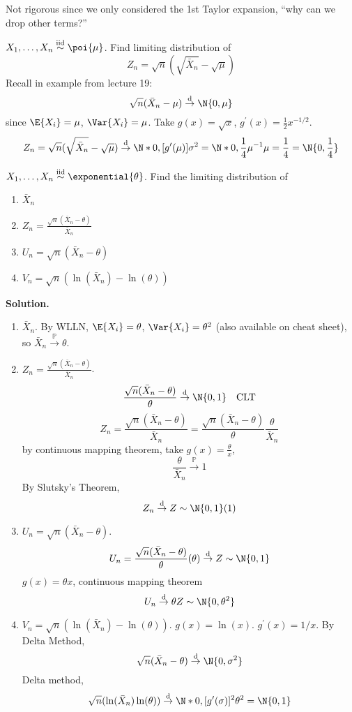 Not rigorous since we only considered the 1st Taylor expansion,
``why can we drop other terms?''
\begin{Example}{}{}
    $ X_1,\ldots,X_n \stackrel{\text{iid}}{\sim}\poi{\mu} $.
    Find limiting distribution of
    \[ Z_n=\sqrt{n}(\sqrt{\bar{X}_n}-\sqrt{\mu}) \]
    Recall in example from lecture 19:
    \[ \sqrt{n}(\bar{X}_n-\mu)\stackrel{\text{d}}{\to}
        \N{0,\mu} \]
    since $ \E{X_i}=\mu $, $ \Var{X_i}=\mu $.
    Take $ g(x)=\sqrt{x} $, $ g^\prime(x)=\frac{1}{2} x^{-1/2} $.
    \[ Z_n=\sqrt{n}(\sqrt{\bar{X}_n}-\sqrt{\mu})\stackrel{\text{d}}{\to}
        \N*{0,[g^\prime(\mu)]\sigma^2}=
        \N*{0,\frac{1}{4}\mu^{-1}\mu=\frac{1}{4}}=\N{0,\frac{1}{4}} \]
\end{Example}
\begin{Example}{}{}
    $ X_1,\ldots,X_n \stackrel{\text{iid}}{\sim}\exponential{\theta} $.
    Find the limiting distribution of
    \begin{enumerate}
        \item $ \bar{X}_n $
        \item $ \displaystyle Z_n=\frac{\sqrt{n}(\bar{X}_n-\theta)}{\bar{X}_n} $
        \item $ U_n=\sqrt{n}(\bar{X}_n-\theta) $
        \item $ V_n=\sqrt{n}(\ln(\bar{X}_n)-\ln(\theta)) $
    \end{enumerate}
    \textbf{Solution.}
    \begin{enumerate}
        \item $ \bar{X}_n $.
              By WLLN, $ \E{X_i}=\theta $, $ \Var{X_i}=\theta^2 $
              (also available on cheat sheet), so $ \bar{X}_n
                  \stackrel{\mathbb{P}}{\to}\theta $.
        \item $ \displaystyle Z_n=\frac{\sqrt{n}(\bar{X}_n-\theta)}{\bar{X}_n} $.
              \[ \frac{\sqrt{n}(\bar{X}_n-\theta)}{\theta} \stackrel{\text{d}}{\to}
                  \N{0,1}\quad \text{CLT} \]
              \[ Z_n=\frac{\sqrt{n}(\bar{X}_n-\theta)}{\bar{X}_n}=
                  \frac{\sqrt{n}(\bar{X}_n-\theta)}{\theta}\frac{\theta}{\bar{X}_n} \]
              by continuous mapping theorem, take $ g(x)=\frac{\theta}{x} $,
              \[ \frac{\theta}{\bar{X}_n}\stackrel{\mathbb{P}}{\to}1 \]
              By Slutsky's Theorem,
              \[ Z_n\stackrel{\text{d}}{\to}Z \sim \N{0,1}(1) \]
        \item $ U_n=\sqrt{n}(\bar{X}_n-\theta) $.
              \[ U_n=\frac{\sqrt{n}(\bar{X}_n-\theta)}{\theta}(\theta)
                  \stackrel{\text{d}}{\to}Z \sim \N{0,1}
              \]
              $ g(x)=\theta x $, continuous mapping theorem
              \[ U_n\stackrel{\text{d}}{\to}\theta Z \sim \N{0,\theta^2} \]
        \item $ V_n=\sqrt{n}(\ln(\bar{X}_n)-\ln(\theta)) $.
              $ g(x)=\ln(x) $. $ g^\prime(x)=1/x $. By Delta Method,
              \[ \sqrt{n}(\bar{X}_n-\theta)\stackrel{\text{d}}{\to}
                  \N{0,\sigma^2} \]
              Delta method,
              \[ \sqrt{n}(\ln(\bar{X}_n)\ln(\theta))
                  \stackrel{\text{d}}{\to}\N*{0,[g^\prime(\sigma)]^2\theta^2}=\N{0,1}
              \]
    \end{enumerate}
\end{Example}
